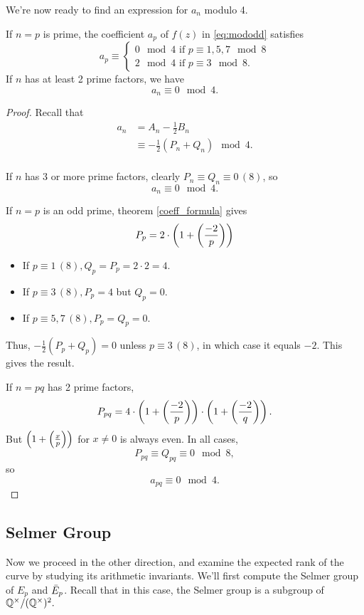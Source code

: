 \documentclass[12pt, a4paper]{amsart}
\begin{document}
We're now ready to find an expression for $a_n$ modulo 4. 

\begin{thm}
  If $n = p$ is prime, the coefficient $a_p$ of $f(z)$ in \autoref{eq:mododd}
  satisfies
  \[a_p \equiv \begin{cases}
      0 \mod{4} \text{ if } p \equiv 1,5,7 \mod{8} \\
      2 \mod{4} \text{ if } p \equiv 3 \mod{8}.
    \end{cases}\]
  If $n$ has at least 2 prime factors, we have
  \[a_n \equiv 0 \mod{4}.\]
\end{thm}
\begin{proof}
  Recall that
  \[
    \begin{split}
      a_n &= A_n - \frac{1}{2}B_n \\
      &\equiv -\frac{1}{2}(P_n + Q_n) \mod{4}. \\
    \end{split}
  \]

  If $n$ has 3 or more prime factors, clearly $P_n \equiv Q_n \equiv 0 \,(8)$, so
  \[a_n\equiv 0 \mod{4}.\]

  If $n = p$ is an odd prime, theorem \autoref{coeff_formula} gives
  \[P_p = 2 \cdot \left( 1 + \left(\frac{-2}{p}\right) \right)\]
  \begin{itemize}
  \item If $p \equiv 1 \, (8), Q_p = P_p = 2 \cdot 2 = 4$.

  \item If $p \equiv 3 \, (8), P_p = 4$ but $Q_p = 0$.

  \item If $p \equiv 5, 7 \, (8), P_p = Q_p = 0$.
  \end{itemize}
  Thus, $-\frac{1}{2} (P_p + Q_p) = 0$ unless $p \equiv 3 \, (8)$, in which case
  it equals $-2$. This gives the result.

  If $n = pq$ has 2 prime factors,
  \[P_{pq} = 4 \cdot \left( 1 + \left(\frac{-2}{p}\right) \right) \cdot
    \left( 1 + \left(\frac{-2}{q}\right) \right).\]
  But $\left( 1 + \left(\frac{x}{p}\right) \right)$ for $x \neq 0$ is always even.
  In all cases,
  \[P_{pq} \equiv Q_{pq} \equiv 0 \mod{8},\]
  so 
  \[a_{pq} \equiv 0 \mod{4}.\]
\end{proof}


\subsection{Selmer Group}

Now we proceed in the other direction, and examine the expected rank of the
curve by studying its arithmetic invariants. We'll first compute the Selmer
group of $E_p$ and $\bar{E}_p$. Recall that in this case, the Selmer group is a
subgroup of ${\mathbb Q}^\times / ({\mathbb Q}^\times)^2.$
\end{document}
